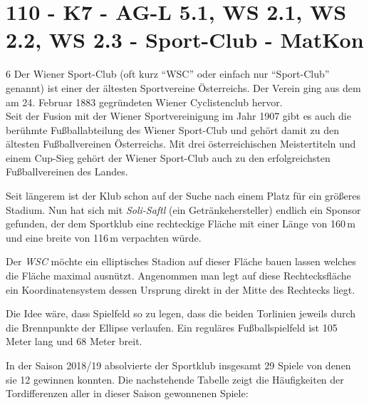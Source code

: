 \section{110 - K7 - AG-L 5.1, WS 2.1, WS 2.2, WS 2.3 - Sport-Club - MatKon}

\begin{langesbeispiel} \item[6] %
Der Wiener Sport-Club (oft kurz "`WSC"' oder einfach nur "`Sport-Club"' genannt) ist einer der ältesten Sportvereine Österreichs. Der Verein ging aus dem am 24. Februar 1883 gegründeten Wiener Cyclistenclub hervor.\\
Seit der Fusion mit der Wiener Sportvereinigung im Jahr 1907 gibt es auch die berühmte Fußballabteilung des Wiener Sport-Club und gehört damit zu den ältesten Fußballvereinen Österreichs. Mit drei österreichischen Meistertiteln und einem Cup-Sieg gehört der Wiener Sport-Club auch zu den erfolgreichsten Fußballvereinen des Landes.

Seit längerem ist der Klub schon auf der Suche nach einem Platz für ein größeres Stadium. Nun hat sich mit \textit{Soli-Saftl} (ein Getränkehersteller) endlich ein Sponsor gefunden, der dem Sportklub eine rechteckige Fläche mit einer Länge von 160\,m und eine breite von 116\,m verpachten würde.%

\begin{aufgabenstellung}
\item Der \textit{WSC} möchte ein elliptisches Stadion auf dieser Fläche bauen lassen welches die Fläche maximal ausnützt. Angenommen man legt auf diese Rechtecksfläche ein Koordinatensystem dessen Ursprung direkt in der Mitte des Rechtecks liegt.%


Die Idee wäre, dass Spielfeld so zu legen, dass die beiden Torlinien jeweils durch die Brennpunkte der Ellipse verlaufen. Ein reguläres Fußballspielfeld ist 105 Meter lang und 68 Meter breit. 


\item In der Saison 2018/19 absolvierte der Sportklub insgesamt 29 Spiele von denen sie 12 gewinnen konnten. Die nachstehende Tabelle zeigt die Häufigkeiten der Tordifferenzen aller in dieser Saison gewonnenen Spiele:
	

\end{aufgabenstellung}
\end{langesbeispiel}
